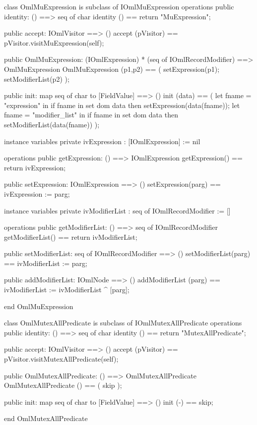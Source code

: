 \begin{vdm_al}
class OmlMuExpression is subclass of IOmlMuExpression
operations
  public identity: () ==> seq of char
  identity () == return "MuExpression";

  public accept: IOmlVisitor ==> ()
  accept (pVisitor) == pVisitor.visitMuExpression(self);

  public OmlMuExpression:
      (IOmlExpression) *
      (seq of IOmlRecordModifier) ==> OmlMuExpression
  OmlMuExpression (p1,p2) == 
   ( setExpression(p1);
     setModifierList(p2) );

  public init: map seq of char to [FieldValue] ==> ()
  init (data) ==
    ( let fname = "expression" in
        if fname in set dom data
        then setExpression(data(fname));
      let fname = "modifier_list" in
        if fname in set dom data
        then setModifierList(data(fname)) );

instance variables
  private ivExpression : [IOmlExpression] := nil

operations
  public getExpression: () ==> IOmlExpression
  getExpression() == return ivExpression;

  public setExpression: IOmlExpression ==> ()
  setExpression(parg) == ivExpression := parg;

instance variables
  private ivModifierList : seq of IOmlRecordModifier := []

operations
  public getModifierList: () ==> seq of IOmlRecordModifier
  getModifierList() == return ivModifierList;

  public setModifierList: seq of IOmlRecordModifier ==> ()
  setModifierList(parg) == ivModifierList := parg;

  public addModifierList: IOmlNode ==> ()
  addModifierList (parg) == ivModifierList := ivModifierList ^ [parg];

end OmlMuExpression
\end{vdm_al}

\begin{vdm_al}
class OmlMutexAllPredicate is subclass of IOmlMutexAllPredicate
operations
  public identity: () ==> seq of char
  identity () == return "MutexAllPredicate";

  public accept: IOmlVisitor ==> ()
  accept (pVisitor) == pVisitor.visitMutexAllPredicate(self);

  public OmlMutexAllPredicate:
      () ==> OmlMutexAllPredicate
  OmlMutexAllPredicate () == 
    ( skip );

  public init: map seq of char to [FieldValue] ==> ()
  init (-) == skip;

end OmlMutexAllPredicate
\end{vdm_al}

